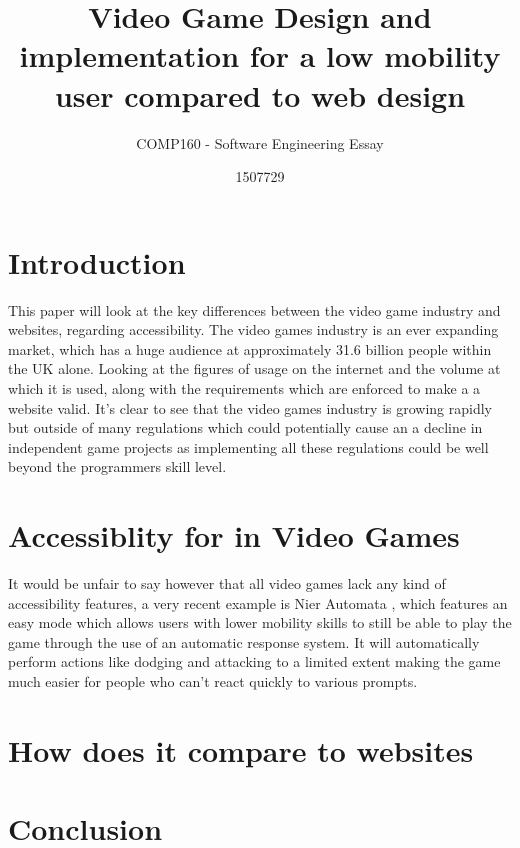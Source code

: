 \documentclass{scrartcl}
\title{Video Game Design and implementation for a low mobility user compared to web design}
\subtitle{COMP160 - Software Engineering Essay}
\author{1507729}
\begin{document}
\maketitle



\section{Introduction}

This paper will look at the key differences between the video game industry and websites, regarding accessibility. The video games industry is an ever expanding market, which has a huge audience at approximately 31.6 billion people within the UK alone. \cite{UKIE2017Games} Looking at the figures of usage on the internet and the volume at which it is used, along with the requirements which are enforced to make a a website valid. \cite{world2017internet} \cite{caldwell2008web} It's clear to see that the video games industry is growing rapidly but outside of many regulations which could potentially cause an a decline in independent game projects as implementing all these regulations could be well beyond the programmers skill level.

\section{Accessiblity for in Video Games}

It would be unfair to say however that all video games lack any kind of accessibility features, a very recent example is Nier Automata \cite{Platinum2017Nier}, which features an easy mode which allows users with lower mobility skills to still be able to play the game through the use of an automatic response system. It will automatically perform actions like dodging and attacking to a limited extent making the game much easier for people who can't react quickly to various prompts. 

\section{How does it compare to websites}


\section{Conclusion}




\end{document}
